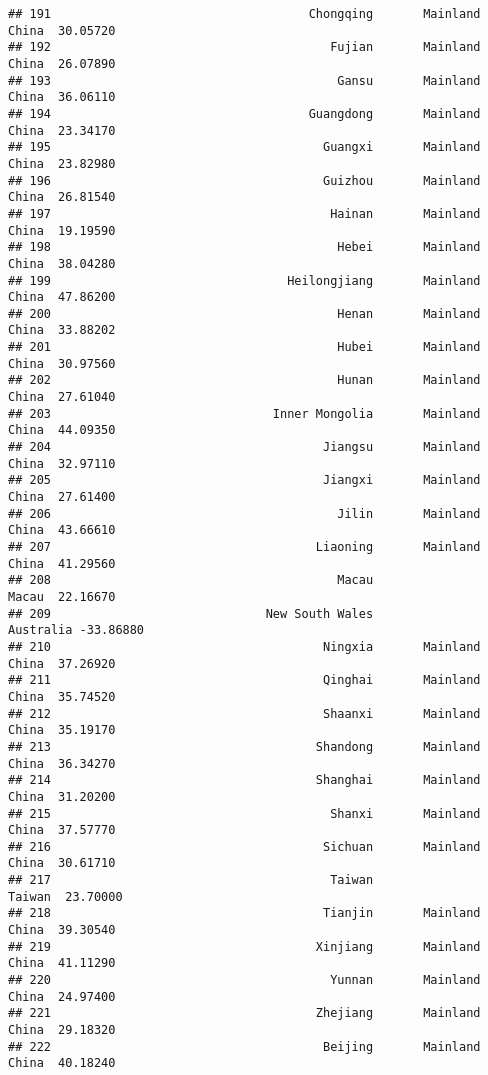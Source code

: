 \documentclass[
]{article}
\begin{document}
\begin{verbatim}
## 191                                    Chongqing       Mainland China  30.05720
## 192                                       Fujian       Mainland China  26.07890
## 193                                        Gansu       Mainland China  36.06110
## 194                                    Guangdong       Mainland China  23.34170
## 195                                      Guangxi       Mainland China  23.82980
## 196                                      Guizhou       Mainland China  26.81540
## 197                                       Hainan       Mainland China  19.19590
## 198                                        Hebei       Mainland China  38.04280
## 199                                 Heilongjiang       Mainland China  47.86200
## 200                                        Henan       Mainland China  33.88202
## 201                                        Hubei       Mainland China  30.97560
## 202                                        Hunan       Mainland China  27.61040
## 203                               Inner Mongolia       Mainland China  44.09350
## 204                                      Jiangsu       Mainland China  32.97110
## 205                                      Jiangxi       Mainland China  27.61400
## 206                                        Jilin       Mainland China  43.66610
## 207                                     Liaoning       Mainland China  41.29560
## 208                                        Macau                Macau  22.16670
## 209                              New South Wales            Australia -33.86880
## 210                                      Ningxia       Mainland China  37.26920
## 211                                      Qinghai       Mainland China  35.74520
## 212                                      Shaanxi       Mainland China  35.19170
## 213                                     Shandong       Mainland China  36.34270
## 214                                     Shanghai       Mainland China  31.20200
## 215                                       Shanxi       Mainland China  37.57770
## 216                                      Sichuan       Mainland China  30.61710
## 217                                       Taiwan               Taiwan  23.70000
## 218                                      Tianjin       Mainland China  39.30540
## 219                                     Xinjiang       Mainland China  41.11290
## 220                                       Yunnan       Mainland China  24.97400
## 221                                     Zhejiang       Mainland China  29.18320
## 222                                      Beijing       Mainland China  40.18240

\end{verbatim}
\end{document}
